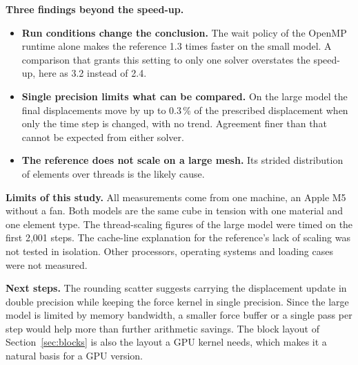 \documentclass[11pt,a4paper]{article}
\begin{document}
\textbf{Three findings beyond the speed-up.}
\begin{itemize}
\item \textbf{Run conditions change the conclusion.} The wait policy of the OpenMP runtime alone makes the reference 1.3 times faster on the small model. A comparison that grants this setting to only one solver overstates the speed-up, here as 3.2 instead of 2.4.
\item \textbf{Single precision limits what can be compared.} On the large model the final displacements move by up to 0.3\,\% of the prescribed displacement when only the time step is changed, with no trend. Agreement finer than that cannot be expected from either solver.
\item \textbf{The reference does not scale on a large mesh.} Its strided distribution of elements over threads is the likely cause.
\end{itemize}

\textbf{Limits of this study.} All measurements come from one machine, an Apple M5 without a fan. Both models are the same cube in tension with one material and one element type. The thread-scaling figures of the large model were timed on the first 2,001 steps. The cache-line explanation for the reference's lack of scaling was not tested in isolation. Other processors, operating systems and loading cases were not measured.

\textbf{Next steps.} The rounding scatter suggests carrying the displacement update in double precision while keeping the force kernel in single precision. Since the large model is limited by memory bandwidth, a smaller force buffer or a single pass per step would help more than further arithmetic savings. The block layout of Section~\ref{sec:blocks} is also the layout a GPU kernel needs, which makes it a natural basis for a GPU version.
\end{document}

